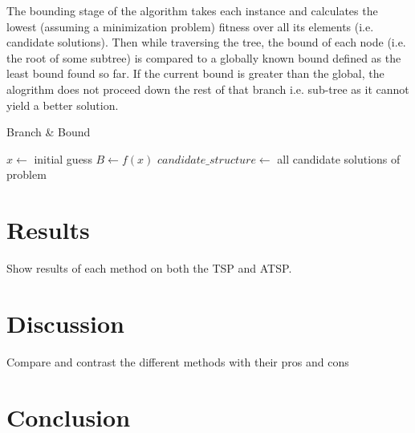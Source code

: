 \documentclass{article}
\begin{document}
            The bounding stage of the algorithm takes each instance and calculates the lowest (assuming a minimization problem) fitness over all its elements (i.e. candidate solutions).  Then while traversing the tree, the bound of each node (i.e. the root of some subtree) is compared to a globally known bound defined as the least bound found so far.  If the current bound is greater than the global, the alogrithm does not proceed down the rest of that branch i.e. sub-tree as it cannot yield a better solution.

            \begin{algorithm}
                \DontPrintSemicolon
                \caption{Branch \& Bound}
                \label{alg:bb}
                $x \gets $ initial guess\;
                $B \gets f(x)$\;
                $candidate\_structure \gets$ all candidate solutions of problem\;
            \end{algorithm}

    \section*{Results}

        Show results of each method on both the TSP and ATSP.

    \section*{Discussion}

        Compare and contrast the different methods with their pros and cons

    \section*{Conclusion}

    \printbibliography
\end{document}
